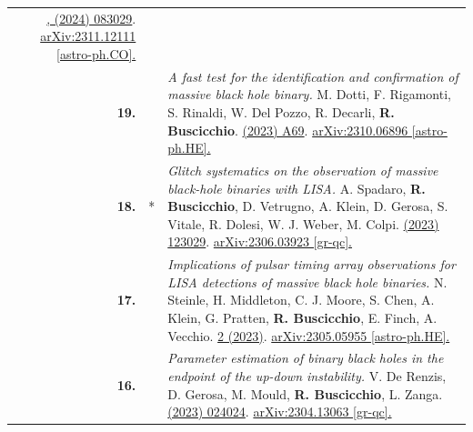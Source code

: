 {\begin{longtable}{rp{0.3cm}p{15.8cm}}
\newline{}
\href{https://journals.aps.org/prd/abstract/10.1103/PhysRevD.109.083029}{\prd 109, (2024) 083029}. \href{https://arxiv.org/abs/2311.12111}{arXiv:2311.12111 [astro-ph.CO].}
\vspace{0.09cm}\\
%
\textbf{19.} & & \textit{A fast test for the identification and confirmation of massive black hole binary.}
\newline{}
M. Dotti, F. Rigamonti, S. Rinaldi, W. Del Pozzo, R. Decarli, \textbf{R. Buscicchio}.
\newline{}
\href{https://www.aanda.org/articles/aa/abs/2023/12/aa46916-23/aa46916-23.html}{\aap 680 (2023) A69}. \href{https://arxiv.org/abs/2310.06896}{arXiv:2310.06896 [astro-ph.HE].}
\vspace{0.09cm}\\
%
\textbf{18.} & * & \textit{Glitch systematics on the observation of massive black-hole binaries with LISA.}
\newline{}
A. Spadaro, \textbf{R. Buscicchio}, D. Vetrugno, A. Klein, D. Gerosa, S. Vitale, R. Dolesi, W. J. Weber, M. Colpi.
\newline{}
\href{https://journals.aps.org/prd/abstract/10.1103/PhysRevD.108.123029}{\prd 108 (2023) 123029}. \href{https://arxiv.org/abs/2306.03923}{arXiv:2306.03923 [gr-qc].}
\vspace{0.09cm}\\
%
\textbf{17.} & & \textit{Implications of pulsar timing array observations for LISA detections of massive black hole binaries.}
\newline{}
N. Steinle, H. Middleton, C. J. Moore, S. Chen, A. Klein, G. Pratten, \textbf{R. Buscicchio}, E. Finch, A. Vecchio.
\newline{}
\href{https://academic.oup.com/mnras/article/525/2/2851/7244712}{\mnras 525 2 (2023)}. \href{https://arxiv.org/abs/2305.05955}{arXiv:2305.05955 [astro-ph.HE].}
\vspace{0.09cm}\\
%
\textbf{16.} & & \textit{Parameter estimation of binary black holes in the endpoint of the up-down instability.}
\newline{}
V. De Renzis, D. Gerosa, M. Mould, \textbf{R. Buscicchio}, L. Zanga.
\newline{}
\href{https://journals.aps.org/prd/abstract/10.1103/PhysRevD.108.024024}{\prd 108 (2023) 024024}. \href{https://arxiv.org/abs/2304.13063}{arXiv:2304.13063 [gr-qc].}
\vspace{0.09cm}\\

\end{longtable}}
